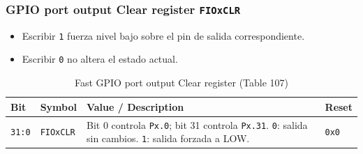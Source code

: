 \subsubsection{GPIO port output Clear register \texttt{FIOxCLR}}
\begin{itemize}
  \item Escribir \texttt{1} fuerza nivel bajo sobre el pin de salida correspondiente.
  \item Escribir \texttt{0} no altera el estado actual.
\end{itemize}

\begin{table}[H]
  \centering
  \small
  \caption{Fast GPIO port output Clear register (Table 107)}
  \begin{tabularx}{0.96\textwidth}{|>{\centering\arraybackslash}p{}|>{\raggedright\arraybackslash}p{}|>{\raggedright\arraybackslash}X|>{\centering\arraybackslash}p{}|}
    \hline
    \textbf{Bit} & \textbf{Symbol} & \textbf{Value / Description} & \textbf{Reset} \\
    \hline
    \texttt{31:0} & \texttt{FIOxCLR} & Bit 0 controla \texttt{Px.0}; bit 31 controla \texttt{Px.31}. \texttt{0}: salida sin cambios. \texttt{1}: salida forzada a LOW. & \texttt{0x0} \\
    \hline
  \end{tabularx}
\end{table}

